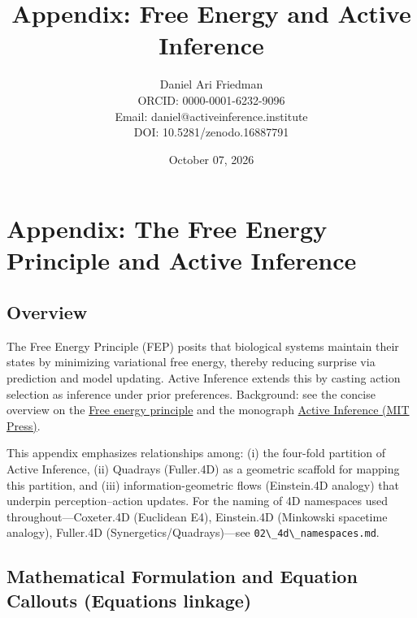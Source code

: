 \documentclass[
  10pt,
]{article}
\title{Appendix: Free Energy and Active Inference}
\author{Daniel Ari Friedman\\ ORCID: 0000-0001-6232-9096\\ Email: daniel@activeinference.institute\\ DOI: 10.5281/zenodo.16887791}
\date{October 07, 2026}
\newcommand{\passthrough}[1]{#1}
\begin{document}
\maketitle

{
\hypersetup{linkcolor=black}
\setcounter{tocdepth}{3}
\tableofcontents
}
\section{Appendix: The Free Energy Principle and Active
Inference}\label{appendix-the-free-energy-principle-and-active-inference}

\subsection{Overview}\label{overview}

The Free Energy Principle (FEP) posits that biological systems maintain
their states by minimizing variational free energy, thereby reducing
surprise via prediction and model updating. Active Inference extends
this by casting action selection as inference under prior preferences.
Background: see the concise overview on the
\href{https://en.wikipedia.org/wiki/Free_energy_principle}{Free energy
principle} and the monograph
\href{https://direct.mit.edu/books/oa-monograph/5299/Active-InferenceThe-Free-Energy-Principle-in-Mind}{Active
Inference (MIT Press)}.

This appendix emphasizes relationships among: (i) the four-fold
partition of Active Inference, (ii) Quadrays (Fuller.4D) as a geometric
scaffold for mapping this partition, and (iii) information-geometric
flows (Einstein.4D analogy) that underpin perception--action updates.
For the naming of 4D namespaces used throughout---Coxeter.4D (Euclidean
E4), Einstein.4D (Minkowski spacetime analogy), Fuller.4D
(Synergetics/Quadrays)---see
\passthrough{\lstinline!02\_4d\_namespaces.md!}.

\subsection{Mathematical Formulation and Equation Callouts (Equations
linkage)}\label{mathematical-formulation-and-equation-callouts-equations-linkage}
\end{document}
